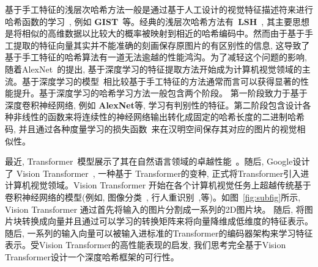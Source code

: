 基于手工特征的浅层次哈希方法一般是通过基于人工设计的视觉特征描述符来进行哈希函数的学习~\cite{charikar2002similarity, indyk1997locality, weiss2008spectral}, 例如 \textbf{GIST}~\cite{oliva2001modeling}等。经典的浅层次哈希方法有~\textbf{LSH}~\cite{indyk1997locality}, 其主要思想是将相似的高维数据以比较大的概率被映射到相近的哈希编码中。然而由于基于手工提取的特征向量其实并不能准确的刻画保存原图片的有区别性的信息, 这导致了基于手工特征的哈希算法有一道无法逾越的性能鸿沟。为了减轻这个问题的影响, 随着AlexNet~\cite{alexnet}的提出, 基于深度学习的特征提取方法开始成为计算机视觉领域的主流。基于深度学习的模型~\cite{dosovitskiy2020image, russakovsky2015imagenet}相比较基于手工特征的方法通常而言可以获得显著的性能提升。基于深度学习的哈希学习方法一般包含两个阶段。 第一阶段致力于基于深度卷积神经网络, 例如 \textbf{AlexNet}等, 学习有判别性的特征。第二阶段包含设计各种非线性的函数来将连续性的神经网络输出转化成固定的哈希长度的二进制哈希码, 并且通过各种度量学习的损失函数~\cite{cakir2019hashing,cao2018deep,erin2015deep,gong2012iterative, li2015feature}来在汉明空间保存其对应的图片的视觉相似性。 \par
最近, Transformer~\cite{vaswani2017attention}模型展示了其在自然语言领域的卓越性能~\cite{brown2020language, devlin2018bert}。随后, Google设计了 Vision Transformer~\cite{dosovitskiy2020image}, 一种基于 Transformer的变种, 正式将Transformer引入进计算机视觉领域。Vision Transformer 开始在各个计算机视觉任务上超越传统基于卷积神经网络的模型(例如, 图像分类~\cite{dosovitskiy2020image}, 行人重识别~\cite{he2021transreid},等)。如图~\ref{fig:subfig}所示, Vision Transformer 通过首先将输入的图片分割成一系列的2D图片块。 随后, 将图片块转换成向量并且通过可以学习的转换矩阵来将向量降维成低维度的特征表示。 随后, 一系列的输入向量可以被输入进标准的Transformer的编码器架构来学习特征表示。受Vision Transformer的高性能表现的启发, 我们思考完全基于Vision Transformer设计一个深度哈希框架的可行性。\par
